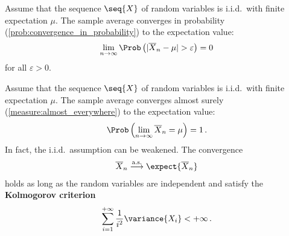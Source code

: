     \begin{theorem}
        Assume that the sequence $\seq{X}$ of random variables is i.i.d.~with finite expectation $\mu$. The sample average converges in probability (\cref{prob:convergence_in_probability}) to the expectation value:
        \begin{gather}
            \lim_{n\rightarrow\infty}\Prob\left(|\overline{X}_n-\mu|>\varepsilon\right)=0
        \end{gather}
        for all $\varepsilon>0$.
    \end{theorem}
    \begin{theorem}\label{prob:strong_lln}
        Assume that the sequence $\seq{X}$ of random variables is i.i.d.~with finite expectation $\mu$. The sample average converges almost surely (\cref{measure:almost_everywhere}) to the expectation value:
        \begin{gather}
            \Prob\left(\lim_{n\rightarrow\infty}\overline{X}_n=\mu\right)=1\,.
        \end{gather}
        In fact, the i.i.d.~assumption can be weakened. The convergence
        \begin{gather}
            \overline{X}_n\overset{\text{a.s.}}{\longrightarrow}\expect{\overline{X}_n}
        \end{gather}
        holds as long as the random variables are independent and satisfy the \textbf{Kolmogorov criterion}
        \begin{gather}
            \sum_{i=1}^{+\infty}\frac{1}{i^2}\variance{X_i}<+\infty\,.
        \end{gather}
    \end{theorem}


